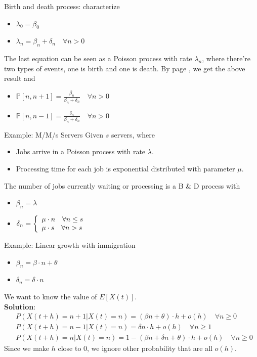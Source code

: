 \documentclass[mathserif]{beamer}
\begin{document}
\begin{frame}{Birth and death process: characterize}
\begin{itemize}
\item $\lambda_0 = \beta_0$
\item $\lambda_n = \beta_n + \delta_n \quad\forall n > 0$
\end{itemize}
The last equation can be seen as a Poisson process with rate $\lambda_n$, where there're two types of events, one is birth and one is death.
By page \pageref{property_1}, we get the above result and
\begin{itemize}
\item $\mathbb{P}[n,n+1] = \frac{\beta_n}{\beta_n + \delta_n} \quad\forall n > 0$
\item $\mathbb{P}[n,n-1] = \frac{\delta_n}{\beta_n + \delta_n} \quad\forall n > 0$
\end{itemize}
\end{frame}

\begin{frame}{Example: M/M/s Servers}
Given $s$ servers, where
\begin{itemize}
\item Jobs arrive in a Poisson process with rate $\lambda$.
\item Processing time for each job is exponential distributed with parameter $\mu$.
\end{itemize}
The number of jobs currently waiting or processing is a B \& D process with
\begin{itemize}
\item $\beta_n = \lambda$
\item $\displaystyle{\delta_n = \left\{
\begin{array}{l l}
\mu\cdot n \quad\forall n\leq s \\
\mu\cdot s \quad\forall n > s \\
\end{array}
\right.}$
\end{itemize}
\end{frame}

\begin{frame}{Example: Linear growth with immigration}
\begin{itemize}
\item $\beta_n = \beta\cdot n + \theta$
\item $\delta_n = \delta\cdot n$
\end{itemize}
We want to know the value of $E[X(t)]$.\\
\vspace{\baselineskip}
\textbf{Solution}:
\begin{align*}
& P(X(t+h)=n+1|X(t)=n) = (\beta n + \theta)\cdot h + o(h) \quad\forall n\geq 0 \\
& P(X(t+h)=n-1|X(t)=n) = \delta n \cdot h + o(h) \quad\forall n\geq 1 \\
& P(X(t+h)=n|X(t)=n) = 1 - (\beta n + \delta n + \theta)\cdot h + o(h) \quad\forall n\geq 0
\end{align*}
Since we make $h$ close to $0$, we ignore other probability that are all $o(h)$.
\end{frame}
\end{document}
